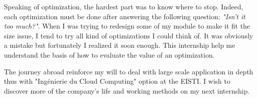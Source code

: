 \documentclass[a4paper,11pt]{report}
\begin{document}
Speaking of optimization, the hardest part was to know where to stop. Indeed, each optimization must be done after answering the following question: \textit{"Isn't it too much?"}. When I was trying to redesign some of my module to make it fit the size issue, I tend to try all kind of optimizations I could think of. It was obviously a mistake but fortunately I realized it soon enough. This internship help me understand the basis of how to evaluate the value of an optimization.

The journey abroad reinforce my will to deal with large scale application in depth thus with "Ingénierie du Cloud Computing" option at the EISTI. I wish to discover more of the company's life and working methods on my next internship.

\clearpage




\clearpage



\newpage

\end{document}
